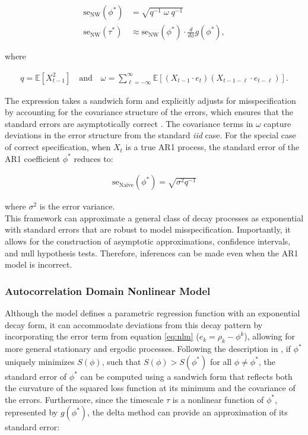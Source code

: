 \documentclass[main.tex]{subfiles}
\begin{document}
\begin{align}
    \text{se}_{\text{NW}}(\phi^*) &= \sqrt{q^{-1}\; \omega \; q^{-1}} \label{eq:se-ar1-phi}\\
    \text{se}_{\text{NW}}(\tau^*) &\approx \text{se}_{\text{NW}}(\phi^*) \cdot \frac{d}{d\phi} g(\phi^*),
\end{align}

\noindent where

\begin{align}
    q = \mathbb{E}[X_{t-1}^2] \quad\text{and}\quad \omega = \sum_{\ell=-\infty}^{\infty} \mathbb{E}[(X_{t-1} \cdot e_t)(X_{t-1-\ell} \cdot e_{t-\ell})].
\end{align}

The expression takes a sandwich form and explicitly adjusts for misspecification by accounting for the covariance structure of the errors, which ensures that the standard errors are asymptotically correct \citep[theorem 14.32]{hansen_econometrics_2022}. The covariance terms in $\omega$ capture deviations in the error structure from the standard \textit{iid} case. For the special case of correct specification, when $X_t$ is a true AR1 process, the standard error of the AR1 coefficient $\phi^*$ reduces to:

\begin{align}
    \text{se}_{\text{Naive}}(\phi^*) = \sqrt{\sigma^2 q^{-1}}
\end{align}

\noindent where $\sigma^2$ is the error variance. \\

This framework can approximate a general class of decay processes as exponential with standard errors that are robust to model misspecification. Importantly, it allows for the construction of asymptotic approximations, confidence intervals, and null hypothesis tests. Therefore, inferences can be made even when the AR1 model is incorrect.

\subsubsection{Autocorrelation Domain Nonlinear Model}

Although the model defines a parametric regression function with an exponential decay form, it can accommodate deviations from this decay pattern by incorporating the error term from equation \eqref{eq:nlm} ($e_k = \rho_k - \phi^k$), allowing for more general stationary and ergodic processes. Following the description in \citet[chapter~22.8, chapter~23.5]{hansen_econometrics_2022}, if $\phi^*$ uniquely minimizes $S(\phi)$, such that $S(\phi) > S(\phi^*)$ for all $\phi \neq \phi^*$, the standard error of $\phi^*$ can be computed using a sandwich form that reflects both the curvature of the squared loss function at its minimum and the covariance of the errors. Furthermore, since the timescale $\tau$ is a nonlinear function of $\phi^*$, represented by $g(\phi^*)$, the delta method can provide an approximation of its standard error:
\end{document}
